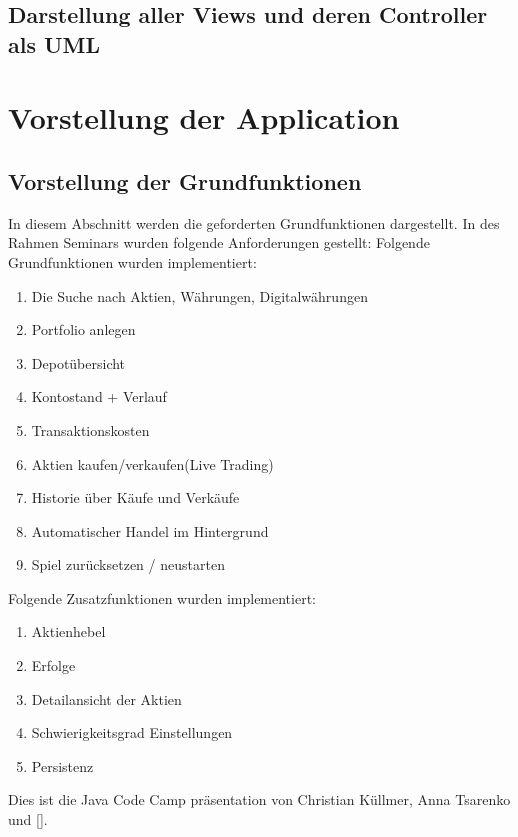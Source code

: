 \documentclass[10pt]{scrartcl}
\begin{document}
\subsection{Darstellung aller Views und deren Controller als UML}

\section{Vorstellung der Application}

\subsection{Vorstellung der Grundfunktionen}
In diesem Abschnitt werden die geforderten Grundfunktionen dargestellt. In des Rahmen Seminars wurden folgende Anforderungen gestellt:
\newline
Folgende Grundfunktionen wurden implementiert:
\begin{enumerate}
	\item Die Suche nach Aktien, Währungen, Digitalwährungen
	\item Portfolio anlegen
	\item Depotübersicht
	\item Kontostand + Verlauf
	\item Transaktionskosten
	\item Aktien kaufen/verkaufen(Live Trading)
	\item Historie über Käufe und Verkäufe
	\item Automatischer Handel im Hintergrund
	\item Spiel zurücksetzen / neustarten
\end{enumerate}

Folgende Zusatzfunktionen wurden implementiert:

\begin{enumerate}
	\item Aktienhebel
	\item Erfolge
	\item Detailansicht der Aktien
	\item Schwierigkeitsgrad Einstellungen
	\item Persistenz
\end{enumerate}

Dies ist die Java Code Camp präsentation von  Christian Küllmer, Anna Tsarenko und [].
\end{document}
